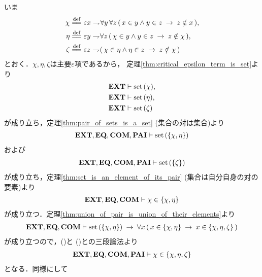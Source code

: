 	\begin{sketch}
		いま
		\begin{align}
			\chi &\defeq \varepsilon x \negation \forall y\, \forall z\, 
				(\, x \in y \wedge y \in z \rarrow z \notin x\, ), \\
			\eta &\defeq \varepsilon y \negation \forall z\, 
				(\, \chi \in y \wedge y \in z \rarrow z \notin \chi\, ), \\
			\zeta &\defeq \varepsilon z \negation 
				(\, \chi \in \eta \wedge \eta \in z \rarrow z \notin \chi\, )
		\end{align}
		とおく．$\chi,\eta,\zeta$は主要$\varepsilon$項であるから，
		定理\ref{thm:critical_epsilon_term_is_set}より
		\begin{align}
			\mbox{{\bf EXT}} &\vdash \operatorname*{set}\hspace{0.15em}(\chi), \label{fom:no_three_sets_go_round_1} \\
			\mbox{{\bf EXT}} &\vdash \operatorname*{set}\hspace{0.15em}(\eta), \label{fom:no_three_sets_go_round_2} \\
			\mbox{{\bf EXT}} &\vdash \operatorname*{set}\hspace{0.15em}(\zeta) \label{fom:no_three_sets_go_round_3}
		\end{align}
		が成り立ち，定理\ref{thm:pair_of_sets_is_a_set} (集合の対は集合)より
		\begin{align}
			\mbox{{\bf EXT}},\mbox{{\bf EQ}},\mbox{\bf COM},\mbox{{\bf PAI}} \vdash \operatorname*{set}\hspace{0.15em}(\{\chi,\eta\})
			\label{fom:no_three_sets_go_round_4}
		\end{align}
		および
		\begin{align}
			\mbox{{\bf EXT}},\mbox{{\bf EQ}},\mbox{\bf COM},\mbox{{\bf PAI}} \vdash \operatorname*{set}\hspace{0.15em}(\{\zeta\})
			\label{fom:no_three_sets_go_round_5}
		\end{align}
		が成り立ち，定理\ref{thm:set_is_an_element_of_its_pair}
		(集合は自分自身の対の要素)より
		\begin{align}
			\mbox{{\bf EXT}},\mbox{{\bf EQ}},\mbox{\bf COM} \vdash \chi \in \{\chi,\eta\}
			\label{fom:no_three_sets_go_round_6}
		\end{align}
		が成り立つ．定理\ref{thm:union_of_pair_is_union_of_their_elements}より
		\begin{align}
			\mbox{{\bf EXT}},\mbox{{\bf EQ}},\mbox{\bf COM} \vdash 
			\operatorname*{set}\hspace{0.15em}(\{\chi,\eta\}) \hspace{0.25em}\rightarrow\hspace{0.25em} \forall x\, (\, x \in \{\chi,\eta\}
			\hspace{0.25em}\rightarrow\hspace{0.25em} x \in \{\chi,\eta,\zeta\}\, )
		\end{align}
		が成り立つので，()と
		()との三段論法より
		\begin{align}
			\mbox{{\bf EXT}},\mbox{{\bf EQ}},\mbox{\bf COM},\mbox{{\bf PAI}} \vdash \chi \in \{\chi,\eta,\zeta\}
			\label{fom:no_three_sets_go_round_7}
		\end{align}
		となる．同様にして
		\begin{align}

\end{align}
\end{sketch}
